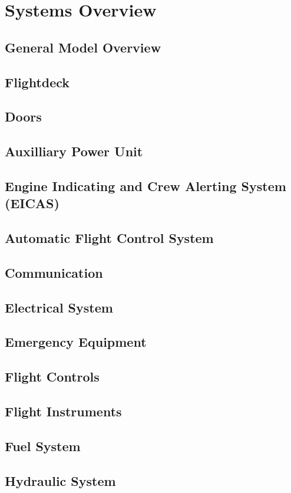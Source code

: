\chapter{Systems Overview}
\section{General Model Overview}
\section{Flightdeck}
\section{Doors}
\section{Auxilliary Power Unit}
\section{Engine Indicating and Crew Alerting System (EICAS)}
\section{Automatic Flight Control System}
\section{Communication}
\section{Electrical System}
\section{Emergency Equipment}
\section{Flight Controls}
\section{Flight Instruments}
\section{Fuel System}
\section{Hydraulic System}
